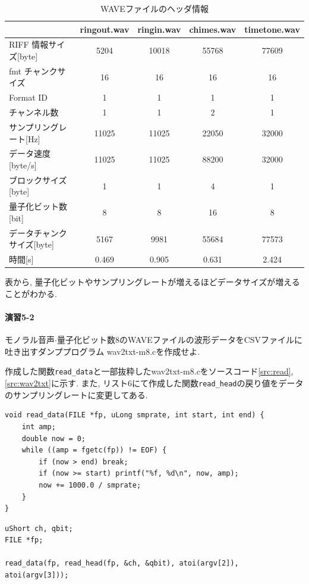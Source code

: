 \documentclass[titlepage]{jsarticle}
\begin{document}
        \begin{table}[ht]
            \centering
            \caption{WAVEファイルのヘッダ情報}
            \label{tab:header}
            \begin{tabular}{l||c|c|c|c} \hline
                                       & ringout.wav   & ringin.wav & chimes.wav & timetone.wav \\ \hline
                RIFF 情報サイズ[byte]    & 5204  & 10018 & 55768 & 77609 \\
                fmt チャンクサイズ       & 16    & 16 & 16 & 16 \\
                Format ID              & 1     & 1   & 1 & 1 \\
                チャンネル数             & 1     & 1 & 2 & 1 \\
                サンプリングレート[Hz]    & 11025 & 11025 & 22050 & 32000 \\
                データ速度[byte/s]       & 11025 & 11025 & 88200 & 32000 \\
                ブロックサイズ[byte]      & 1     & 1 & 4 & 1 \\
                量子化ビット数[bit]       & 8     & 8 & 16 & 8 \\
                データチャンクサイズ[byte] & 5167  & 9981 & 55684 & 77573 \\
                時間[s] & 0.469 & 0.905 & 0.631 & 2.424 \\ \hline
            \end{tabular}
        \end{table}

        表から, 量子化ビットやサンプリングレートが増えるほどデータサイズが増えることがわかる. 

    \paragraph{演習5-2} モノラル音声$\cdot$量子化ビット数8のWAVEファイルの波形データをCSVファイルに吐き出すダンププログラム
    wav2txt-m8.cを作成せよ.

        作成した関数\verb|read_data|と一部抜粋したwav2txt-m8.cをソースコード\ref{src:read},
        \ref{src:wav2txt}に示す.
        また, リスト6にて作成した関数\verb|read_head|の戻り値をデータのサンプリングレートに変更してある.

            \begin{lstlisting}[caption=read\_data.c, label=src:read]
void read_data(FILE *fp, uLong smprate, int start, int end) {
    int amp;
    double now = 0;
    while ((amp = fgetc(fp)) != EOF) {
        if (now > end) break;
        if (now >= start) printf("%f, %d\n", now, amp);
        now += 1000.0 / smprate;
    }
}
            \end{lstlisting}
            \begin{lstlisting}[caption=wav2txt-m8.c, label=src:wav2txt]
uShort ch, qbit;
FILE *fp;

read_data(fp, read_head(fp, &ch, &qbit), atoi(argv[2]), atoi(argv[3]));
            \end{lstlisting}
\end{document}
